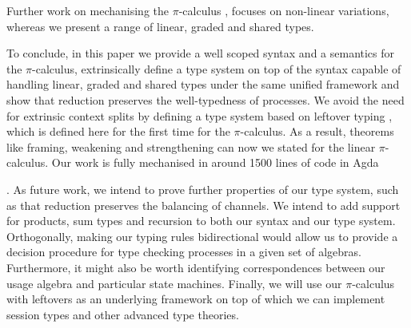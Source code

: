 \documentclass[sigplan,10pt,anonymous,review]{acmart}
\theoremstyle{definition}
\newcommand{\picalc}{$\pi$-calculus}
\begin{document}
Further work on mechanising the \picalc{} \cite{Henry-Gerard1999, Honsell2001a, Bengtson2013, Despeyroux2000, Affeldt2008}, focuses on non-linear variations, whereas we present a range of linear, graded and shared types.

To conclude, in this paper we provide a well scoped syntax and a semantics for the \picalc{}, extrinsically define a type system on top of the syntax capable of handling linear, graded and shared types under the same unified framework and show that reduction preserves the well-typedness of processes.
We avoid the need for extrinsic context splits by defining a type system based on leftover typing \cite{Allais2018a}, which is defined here for the first time for the \picalc{}.
As a result, theorems like framing, weakening and strengthening can now we stated for the linear \picalc{}.
Our work is fully mechanised in around 1500 lines of code in Agda%
\begin{anonsuppress}
\cite{Zalakain2020Agda}
\end{anonsuppress}
.
%
As future work, we intend to prove further properties of our type system, such as that reduction preserves the balancing of channels.
We intend to add support for products, sum types and recursion to both our syntax and our type system.
Orthogonally, making our typing rules bidirectional would allow us to provide a decision procedure for type checking processes in a given set of algebras.
Furthermore, it might also be worth identifying correspondences between our usage algebra and particular state machines.
Finally, we will use our \picalc{} with leftovers as an underlying framework on top of which we can implement session types and other advanced type theories.




\appendix

\end{document}
